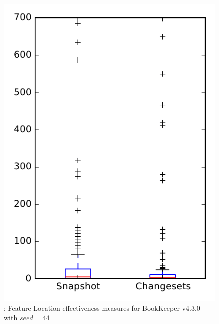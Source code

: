 
\begin{figure}
\centering
\includegraphics[height=0.4\textheight]{figures/flt_seed/rq1_bookkeeper_44}
\caption{\rone: Feature Location effectiveness measures for BookKeeper v4.3.0 with $seed=44$}
\label{fig:flt_seed:rq1:bookkeeper}
\end{figure}
